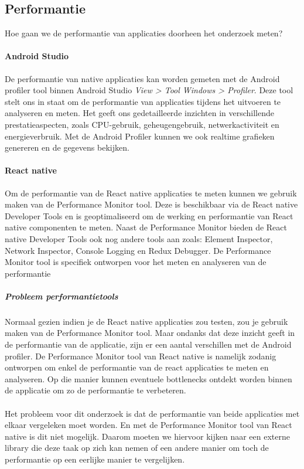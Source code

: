 \subsection{Performantie}
Hoe gaan we de performantie van applicaties doorheen het onderzoek meten?

\paragraph{Android Studio}
De performantie van native applicaties kan worden gemeten met de Android profiler tool binnen Android Studio 
\textit{View > Tool Windows > Profiler}. Deze tool stelt ons in staat om de performantie van applicaties 
tijdens het uitvoeren te analyseren en meten. Het geeft ons gedetailleerde inzichten 
in verschillende prestatieaspecten, zoals CPU-gebruik, geheugengebruik, netwerkactiviteit en 
energieverbruik. Met de Android Profiler kunnen we ook realtime grafieken genereren en de gegevens bekijken. 

\paragraph{React native}
Om de performantie van de React native applicaties te meten kunnen we gebruik maken van de Performance Monitor tool. 
Deze is beschikbaar via de React native Developer Tools en is geoptimaliseerd om de werking en performantie van React native 
componenten te meten. Naast de Performance Monitor bieden de React native Developer 
Tools ook nog andere tools aan zoals: Element Inspector, Network Inspector, Console Logging en Redux Debugger. De 
Performance Monitor tool is specifiek ontworpen voor het meten en analyseren van de performantie

\subparagraph{Probleem performantietools}
Normaal gezien indien je de React native applicaties zou testen, zou je gebruik maken van de Performance Monitor tool.
Maar ondanks dat deze inzicht geeft in de performantie van de applicatie, 
zijn er een aantal verschillen met de Android profiler. De Performance Monitor tool van React native is namelijk zodanig 
ontworpen om enkel de performantie van de react applicaties te meten en analyseren.
Op die manier kunnen eventuele \gls{bottlenecks} ontdekt worden binnen de applicatie om zo de performantie te verbeteren.
\\\\
Het probleem voor dit onderzoek is dat de performantie van beide applicaties met elkaar vergeleken moet worden. 
En met de Performance Monitor tool van React native is dit niet mogelijk. Daarom moeten we hiervoor kijken naar 
een externe library die deze taak op zich kan nemen of een andere manier om toch de performantie op een eerlijke manier 
te vergelijken. 

